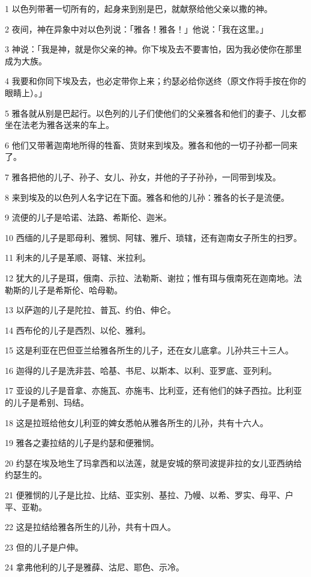\par 1 以色列带著一切所有的，起身来到别是巴，就献祭给他父亲以撒的神。
\par 2 夜间，神在异象中对以色列说：「雅各！雅各！」他说：「我在这里。」
\par 3 神说：「我是神，就是你父亲的神。你下埃及去不要害怕，因为我必使你在那里成为大族。
\par 4 我要和你同下埃及去，也必定带你上来；约瑟必给你送终（原文作将手按在你的眼睛上）。」
\par 5 雅各就从别是巴起行。以色列的儿子们使他们的父亲雅各和他们的妻子、儿女都坐在法老为雅各送来的车上。
\par 6 他们又带著迦南地所得的牲畜、货财来到埃及。雅各和他的一切子孙都一同来了。
\par 7 雅各把他的儿子、孙子、女儿、孙女，并他的子子孙孙，一同带到埃及。
\par 8 来到埃及的以色列人名字记在下面。雅各和他的儿孙：雅各的长子是流便。
\par 9 流便的儿子是哈诺、法路、希斯伦、迦米。
\par 10 西缅的儿子是耶母利、雅悯、阿辖、雅斤、琐辖，还有迦南女子所生的扫罗。
\par 11 利未的儿子是革顺、哥辖、米拉利。
\par 12 犹大的儿子是珥，俄南、示拉、法勒斯、谢拉；惟有珥与俄南死在迦南地。法勒斯的儿子是希斯伦、哈母勒。
\par 13 以萨迦的儿子是陀拉、普瓦、约伯、伸仑。
\par 14 西布伦的儿子是西烈、以伦、雅利。
\par 15 这是利亚在巴但亚兰给雅各所生的儿子，还在女儿底拿。儿孙共三十三人。
\par 16 迦得的儿子是洗非芸、哈基、书尼、以斯本、以利、亚罗底、亚列利。
\par 17 亚设的儿子是音拿、亦施瓦、亦施韦、比利亚，还有他们的妹子西拉。比利亚的儿子是希别、玛结。
\par 18 这是拉班给他女儿利亚的婢女悉帕从雅各所生的儿孙，共有十六人。
\par 19 雅各之妻拉结的儿子是约瑟和便雅悯。
\par 20 约瑟在埃及地生了玛拿西和以法莲，就是安城的祭司波提非拉的女儿亚西纳给约瑟生的。
\par 21 便雅悯的儿子是比拉、比结、亚实别、基拉、乃幔、以希、罗实、母平、户平、亚勒。
\par 22 这是拉结给雅各所生的儿孙，共有十四人。
\par 23 但的儿子是户伸。
\par 24 拿弗他利的儿子是雅薛、沽尼、耶色、示冷。
